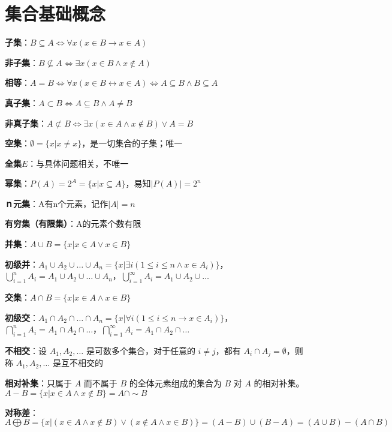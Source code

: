 	\setlength{\abovedisplayskip}{0em}
	\setlength{\belowdisplayskip}{0em}
	
	\section*{集合基础概念}
	\textbf{子集}：$B \subseteq A \Leftrightarrow \forall x (x \in B \rightarrow x \in A)$
	
	\textbf{非子集}：$B \nsubseteq A \Leftrightarrow \exists x (x \in B \land x \notin A)$
	
	\textbf{相等}：$A = B \Leftrightarrow \forall x (x \in B \leftrightarrow x \in A) \Leftrightarrow A \subseteq B \land B \subseteq A$
	
	\textbf{真子集}：$A \subset B \Leftrightarrow A \subseteq B \land A \neq B$
	
	\textbf{非真子集}：$A \not\subset B \Leftrightarrow \exists x (x \in A \land x \notin B) \lor A = B$
	
	\textbf{空集}：$\emptyset = \{x | x \neq x\}$，是一切集合的子集；唯一
	
	\textbf{全集$E$}：与具体问题相关，不唯一
	
	\textbf{幂集}：$P(A) = 2^{A} = \{x | x \subseteq A\}$，易知$|P(A)| = 2^n$
	
	\textbf{ｎ元集}：A有n个元素，记作$|A| = n$
	
	\textbf{有穷集（有限集）}：A的元素个数有限
	
	\textbf{并集}：$A \cup B = \{x | x \in A \lor x \in B\}$
	
	\textbf{初级并}：$A_1 \cup A_2 \cup \ldots \cup A_n = \{x | \exists i (1 \leq i \leq n \land x \in A_i)\}$，$\bigcup_{i=1}^n A_i = A_1 \cup A_2 \cup \ldots \cup A_n$，$\bigcup_{i=1}^\infty A_i = A_1 \cup A_2 \cup \ldots$
	
	\textbf{交集}：$A \cap B = \{x | x \in A \land x \in B\}$
	
	\textbf{初级交}：$A_1 \cap A_2 \cap \ldots \cap A_n = \{x | \forall i (1 \leq i \leq n \rightarrow x \in A_i)\}$，$\bigcap_{i=1}^n A_i = A_1 \cap A_2 \cap \ldots$，$\bigcap_{i=1}^\infty A_i = A_1 \cap A_2 \cap \ldots$
	
	\textbf{不相交}：设 $A_1, A_2, \ldots$ 是可数多个集合，对于任意的 $i \neq j$，都有 $A_i \cap A_j = \emptyset$，则称 $A_1, A_2, \ldots$ 是互不相交的
	
	\textbf{相对补集}：只属于 $A$ 而不属于 $B$ 的全体元素组成的集合为 $B$ 对 $A$ 的相对补集。$A - B = \{x | x \in A \land x \notin B\} = A \cap \sim B$
	
	\textbf{对称差}：$A \bigoplus B = \{x | (x \in A \land x \notin B) \lor (x \notin A \land x \in B)\} = (A - B) \cup (B - A) = (A \cup B) - (A \cap B)$
		
